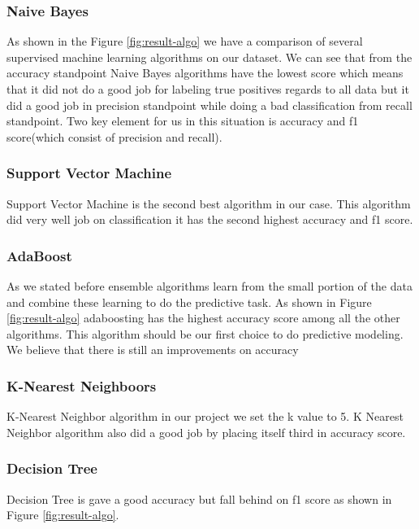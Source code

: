 \documentclass[sigconf]{acmart}
\begin{document}
\subsubsection{\textbf{Naive Bayes}} 
As shown in the Figure \ref{fig:result-algo} we have a comparison of several supervised machine learning algorithms on our dataset. We can see that from the accuracy standpoint Naive Bayes algorithms have the lowest score which means that it did not do a good job for labeling true positives regards to all data but it did a good job in precision standpoint while doing a bad classification from recall standpoint. Two key element for us in this situation is accuracy and f1 score(which consist of precision and recall). 
\subsubsection{\textbf{Support Vector Machine}}
Support Vector Machine is the second best algorithm in our case. This algorithm did very well job on classification it has the second highest accuracy and f1 score. 
\subsubsection{\textbf{AdaBoost}}
As we stated before ensemble algorithms learn from the small portion of the data and combine these learning to do the predictive task. As shown in Figure \ref{fig:result-algo} adaboosting has the highest accuracy score among all the other algorithms. This algorithm should be our first choice to do predictive modeling. We believe that there is still an improvements on accuracy 
\subsubsection{\textbf{K-Nearest Neighboors}}
K-Nearest Neighbor algorithm in our project we set the k value to 5. K Nearest Neighbor algorithm also did a good job by placing itself third in accuracy score. 

\subsubsection{\textbf{Decision Tree}} 
Decision Tree is gave a good accuracy but fall behind on f1 score as shown in Figure \ref{fig:result-algo}.
\end{document}
